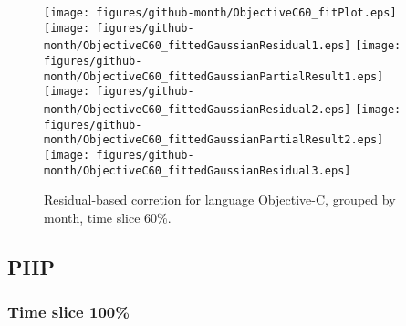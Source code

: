 \begin{figure}[t]
\centering
{}
{\texttt{[image: figures/github-month/ObjectiveC60\_fitPlot.eps]}}
{\texttt{[image: figures/github-month/ObjectiveC60\_fittedGaussianResidual1.eps]}}
{\texttt{[image: figures/github-month/ObjectiveC60\_fittedGaussianPartialResult1.eps]}}
{\texttt{[image: figures/github-month/ObjectiveC60\_fittedGaussianResidual2.eps]}}
{\texttt{[image: figures/github-month/ObjectiveC60\_fittedGaussianPartialResult2.eps]}}
{\texttt{[image: figures/github-month/ObjectiveC60\_fittedGaussianResidual3.eps]}}
\caption{Residual-based corretion for language Objective-C, grouped by month, time slice 60\%.}
\end{figure}


\FloatBarrier


\subsection{PHP}

\subsubsection{Time slice 100\%}

